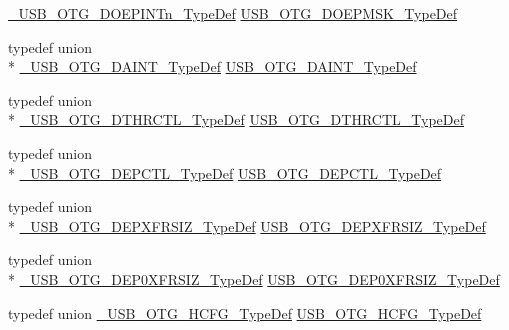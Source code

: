 \begin{DoxyCompactItemize}
\hyperlink{union___u_s_b___o_t_g___d_o_e_p_i_n_tn___type_def}{\-\_\-\-U\-S\-B\-\_\-\-O\-T\-G\-\_\-\-D\-O\-E\-P\-I\-N\-Tn\-\_\-\-Type\-Def} \hyperlink{group______otg___core__registers_ga5d3e6726f3339d87d25bbf1cbe3f06cb}{U\-S\-B\-\_\-\-O\-T\-G\-\_\-\-D\-O\-E\-P\-M\-S\-K\-\_\-\-Type\-Def}
\item 
typedef union \\*
\hyperlink{union___u_s_b___o_t_g___d_a_i_n_t___type_def}{\-\_\-\-U\-S\-B\-\_\-\-O\-T\-G\-\_\-\-D\-A\-I\-N\-T\-\_\-\-Type\-Def} \hyperlink{group______otg___core__registers_ga7cefc9563938698514b33dea30dba7bf}{U\-S\-B\-\_\-\-O\-T\-G\-\_\-\-D\-A\-I\-N\-T\-\_\-\-Type\-Def}
\item 
typedef union \\*
\hyperlink{union___u_s_b___o_t_g___d_t_h_r_c_t_l___type_def}{\-\_\-\-U\-S\-B\-\_\-\-O\-T\-G\-\_\-\-D\-T\-H\-R\-C\-T\-L\-\_\-\-Type\-Def} \hyperlink{group______otg___core__registers_ga601effe1f3fbc4478404917f8bc12a73}{U\-S\-B\-\_\-\-O\-T\-G\-\_\-\-D\-T\-H\-R\-C\-T\-L\-\_\-\-Type\-Def}
\item 
typedef union \\*
\hyperlink{union___u_s_b___o_t_g___d_e_p_c_t_l___type_def}{\-\_\-\-U\-S\-B\-\_\-\-O\-T\-G\-\_\-\-D\-E\-P\-C\-T\-L\-\_\-\-Type\-Def} \hyperlink{group______otg___core__registers_ga177c276553dc4a0b689690bc3b129bf5}{U\-S\-B\-\_\-\-O\-T\-G\-\_\-\-D\-E\-P\-C\-T\-L\-\_\-\-Type\-Def}
\item 
typedef union \\*
\hyperlink{union___u_s_b___o_t_g___d_e_p_x_f_r_s_i_z___type_def}{\-\_\-\-U\-S\-B\-\_\-\-O\-T\-G\-\_\-\-D\-E\-P\-X\-F\-R\-S\-I\-Z\-\_\-\-Type\-Def} \hyperlink{group______otg___core__registers_ga4632c2acbea2a6d17bbe0fe4f2ef6605}{U\-S\-B\-\_\-\-O\-T\-G\-\_\-\-D\-E\-P\-X\-F\-R\-S\-I\-Z\-\_\-\-Type\-Def}
\item 
typedef union \\*
\hyperlink{union___u_s_b___o_t_g___d_e_p0_x_f_r_s_i_z___type_def}{\-\_\-\-U\-S\-B\-\_\-\-O\-T\-G\-\_\-\-D\-E\-P0\-X\-F\-R\-S\-I\-Z\-\_\-\-Type\-Def} \hyperlink{group______otg___core__registers_ga4d5f97e29befba158da9357595cdea21}{U\-S\-B\-\_\-\-O\-T\-G\-\_\-\-D\-E\-P0\-X\-F\-R\-S\-I\-Z\-\_\-\-Type\-Def}
\item 
typedef union \hyperlink{union___u_s_b___o_t_g___h_c_f_g___type_def}{\-\_\-\-U\-S\-B\-\_\-\-O\-T\-G\-\_\-\-H\-C\-F\-G\-\_\-\-Type\-Def} \hyperlink{group______otg___core__registers_ga2dac715b96c39d7b3d22e5a255ebadec}{U\-S\-B\-\_\-\-O\-T\-G\-\_\-\-H\-C\-F\-G\-\_\-\-Type\-Def}
\item 

\end{DoxyCompactItemize}
